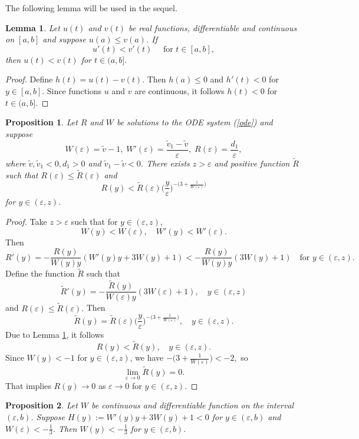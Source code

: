 \documentclass[reqno]{article}%
\theoremstyle{plain}
\newtheorem{lemma}{Lemma}[section]
\newtheorem{proposition}{Proposition}[section]
\theoremstyle{definition}
\theoremstyle{remark}
\numberwithin{equation}{section}
\begin{document}
\medskip

The following lemma will be used in the sequel.
\begin{lemma}\label{comp_thm}
Let $u(t)$ and $v(t)$ be real functions, differentiable and continuous on $[a,b]$ and suppose $u(a)\leq v(a)$. If 
\[u'(t)<v'(t) \quad \text{ for } t\in[a,b],\]
then $u(t)<v(t)$ for $t\in(a,b].$
\end{lemma}
\begin{proof}
 Define $h(t)=u(t)-v(t)$. 
Then $h(a)\leq 0$ and $h'(t)<0$ for $y\in[a,b]$. 
Since functions $u$  and $v$ are continuous, it follows $h(t)<0$ for $t\in(a,b]$.
\end{proof}

\medskip

\begin{proposition}\label{thm:Rvac}
Let $R$ and $W$ be solutions to the ODE system (\ref{ode}) and suppose
\[W(\varepsilon)=\tilde{v}-1,\; W'(\varepsilon)=\frac{\tilde{v}_1-\tilde{v}}{\varepsilon},\; R(\varepsilon)=\frac{d_1}{\varepsilon},\]
where 
$ \tilde{v},\tilde{v}_1<0,d_1>0$ and $\tilde{v}_1-\tilde{v}<0$. There exists $z>\varepsilon$ and positive function $\tilde{R}$ such that $R(\varepsilon)\leq \tilde{R}(\varepsilon)$ and 
\[R(y)<\tilde{R}(\varepsilon)\Big(\frac{y}{\varepsilon}\Big)^{-\big(3+\frac{1}{W(\varepsilon)}\big)}\]
for $y\in(\varepsilon,z)$.
\end{proposition}
\begin{proof}
Take $z>\varepsilon$ such that for $y\in(\varepsilon,z)$,
\[W(y)<W(\varepsilon),\quad W'(y)<W'(\varepsilon).\]
Then
\[R'(y)=-\frac{R(y)}{W(y)y}(W'(y)y+3W(y)+1)<-\frac{R(y)}{W(y)y}(3W(y)+1)  \quad \text{for } y\in(\varepsilon,z).\]
Define the function $\tilde{R}$ such that
\[\tilde{R}'(y)=-\frac{\tilde{R}(y)}{W(\varepsilon)y}(3W(\varepsilon)+1),\quad y\in(\varepsilon,z)\]
and $R(\varepsilon)\leq\tilde{R}(\varepsilon).$
Then
\[\tilde{R}(y)=\tilde{R}(\varepsilon)\Big(\frac{y}{\varepsilon}\Big)^{-\big(3+\frac{1}{W(\varepsilon)}\big)},\quad y\in(\varepsilon,z).\]
Due to Lemma \ref{comp_thm}, it follows 
\[R(y)<\tilde{R}(y),\quad y\in(\varepsilon,z).\]
Since $W(y)<-1$ for $y\in(\varepsilon,z)$, we have $-\big(3+\frac{1}{W(\varepsilon)}\big)<-2,$
so
\[\lim_{\varepsilon\to 0}\tilde{R}(y)=0.\]
That implies $R(y)\to 0$ as $\varepsilon\to 0$ for $y\in(\varepsilon,z).$
\end{proof}

\begin{proposition}\label{thm:H}
Let $W$ be continuous and differentiable function on the interval $(\varepsilon,b)$. 
Suppose $H(y):=W'(y)y+3W(y)+1<0$ for $y\in (\varepsilon,b)$ and $W(\varepsilon)<-\frac{1}{3}$. Then $W(y)< -\frac{1}{3}$ for $y\in(\varepsilon, b).$
\end{proposition}
\end{document}
